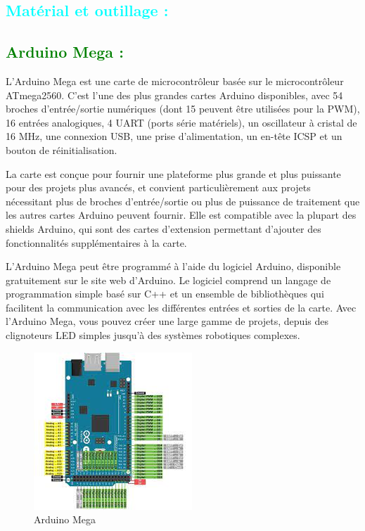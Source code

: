 \begin{flushleft}
	\section{\textcolor{cyan}{Matérial et outillage :}}
	\subsection{\textcolor{green}{Arduino Mega :}}
	L'Arduino Mega est une carte de microcontrôleur basée sur le microcontrôleur ATmega2560. C'est l'une des plus grandes cartes Arduino disponibles, avec 54 broches d'entrée/sortie numériques (dont 15 peuvent être utilisées pour la PWM), 16 entrées analogiques, 4 UART (ports série matériels), un oscillateur à cristal de 16 MHz, une connexion USB, une prise d'alimentation, un en-tête ICSP et un bouton de réinitialisation.
	
	La carte est conçue pour fournir une plateforme plus grande et plus puissante pour des projets plus avancés, et convient particulièrement aux projets nécessitant plus de broches d'entrée/sortie ou plus de puissance de traitement que les autres cartes Arduino peuvent fournir. Elle est compatible avec la plupart des shields Arduino, qui sont des cartes d'extension permettant d'ajouter des fonctionnalités supplémentaires à la carte.
	
	L'Arduino Mega peut être programmé à l'aide du logiciel Arduino, disponible gratuitement sur le site web d'Arduino. Le logiciel comprend un langage de programmation simple basé sur C++ et un ensemble de bibliothèques qui facilitent la communication avec les différentes entrées et sorties de la carte. Avec l'Arduino Mega, vous pouvez créer une large gamme de projets, depuis des clignoteurs LED simples jusqu'à des systèmes robotiques complexes.
	\begin{figure}[h]
		\centering
		\includegraphics{chapitres/images/ArduinoMega.jpg}
		\caption{Arduino Mega}
		\label{fig:labelname}
	\end{figure}

\end{flushleft}
